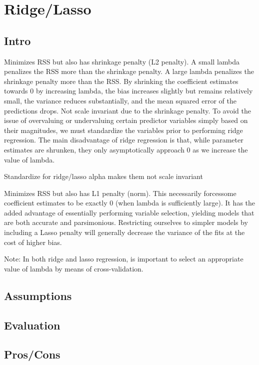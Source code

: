 \documentclass[]{book}
\theoremstyle{definition}
\theoremstyle{definition}
\theoremstyle{definition}
\theoremstyle{remark}
\begin{document}
\section{Ridge/Lasso}\label{ridgelasso}

\subsection{Intro}\label{intro-1}

Minimizes RSS but also has shrinkage penalty (L2 penalty). A small
lambda penalizes the RSS more than the shrinkage penalty. A large lambda
penalizes the shrinkage penalty more than the RSS. By shrinking the
coefficient estimates towards 0 by increasing lambda, the bias increases
slightly but remains relatively small, the variance reduces
substantially, and the mean squared error of the predictions drops. Not
scale invariant due to the shrinkage penalty. To avoid the issue of
overvaluing or undervaluing certain predictor variables simply based on
their magnitudes, we must standardize the variables prior to performing
ridge regression. The main disadvantage of ridge regression is that,
while parameter estimates are shrunken, they only asymptotically
approach 0 as we increase the value of lambda.

Standardize for ridge/lasso alpha makes them not scale invariant

Minimizes RSS but also has L1 penalty (norm). This necessarily
forcessome coefficient estimates to be exactly 0 (when lambda is
sufficiently large). It has the added advantage of essentially
performing variable selection, yielding models that are both accurate
and parsimonious. Restricting ourselves to simpler models by including a
Lasso penalty will generally decrease the variance of the fits at the
cost of higher bias.

Note: In both ridge and lasso regression, is important to select an
appropriate value of lambda by means of cross-validation.

\subsection{Assumptions}\label{assumptions-1}

\subsection{Evaluation}\label{evaluation}

\subsection{Pros/Cons}\label{proscons-1}
\end{document}
